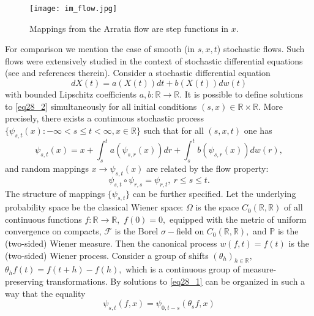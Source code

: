 \documentclass[a4paper,12pt]{article}
\newcommand{\1}{1\!\!\,{\rm I}}
\theoremstyle{plain}
\begin{document}
\begin{figure}[!h]
 \caption{Mappings from the Arratia flow are step functions in $x$.}
 \centering
\texttt{[image: im\_flow.jpg]}
\end{figure}




For comparison we mention the case of smooth (in $s,x,t$) stochastic flows. Such flows were extensively studied in the context of stochastic differential equations (see \cite[Ch. 4]{Kunita} and references therein). Consider a stochastic differential equation 
\begin{equation}
\label{eq28_2}
dX(t)=a(X(t))dt+b(X(t))dw(t)
\end{equation}
with bounded Lipschitz coefficients $a,b:\mathbb{R}\to\mathbb{R}.$ It is possible to define solutions to \eqref{eq28_2} simultaneously for all initial conditions $(s,x)\in\mathbb{R}\times \mathbb{R}.$ More precisely, there exists a continuous stochastic process  $\{\psi_{s,t}(x):-\infty<s\leq t<\infty,x\in \mathbb{R}\}$ such that for all $(s,x,t)$ one has
\begin{equation}
\label{eq28_1}
\psi_{s,t}(x)=x+\int^t_sa(\psi_{s,r}(x))dr+\int^t_s b(\psi_{s,r}(x))dw(r),
\end{equation}
and random mappings $x\to \psi_{s,t}(x)$ are related by the flow property:
\begin{equation}
\label{eq18_4_2}
\psi_{s,t}\circ \psi_{r,s}=\psi_{r,t}, \ r\leq s\leq t.
\end{equation}
The structure of mappings $\{\psi_{s,t}\}$ can be further specified. Let the underlying probability space be the classical Wiener space: $\Omega$ is the space $C_0(\mathbb{R},\mathbb{R})$ of all con\-ti\-nu\-o\-us functions $f:\mathbb{R}\to\mathbb{R},$ $f(0)=0,$ equipped with the metric of uniform convergence on compacts, $\mathcal{F}$ is the Borel $\sigma-$field on $C_0(\mathbb{R},\mathbb{R}),$ and $\mathbb{P}$ is the (two-sided) Wiener measure. Then the canonical process $w(f,t)=f(t)$
is the (two-sided) Wiener process. Consider a group of shifts $(\theta_h)_{h\in\mathbb{R}},$ $\theta_hf(t)=f(t+h)-f(h),$
which is a continuous group of measure-preserving transformations. By \cite[Th. 2.3.40]{Arnold} solutions to \eqref{eq28_1} can be organized in such a way that the equality
\begin{equation}
\label{eq18_4_1}
\psi_{s,t}(f,x)=\psi_{0,t-s}(\theta_s f,x)
\end{equation}
\end{document}
